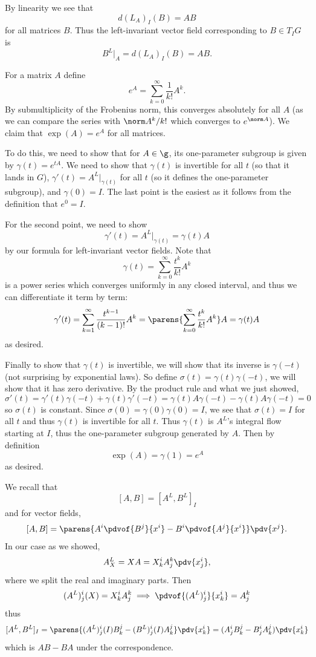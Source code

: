     By linearity we see that
    $$ d(L_A)_I(B) = AB $$
    for all matrices $B$.
    Thus the left-invariant vector field corresponding to $B\in T_IG$ is
    $$ B^L|_A = d(L_A)_I(B) = AB . $$

    \item For a matrix $A$ define
    $$ e^A = \sum_{k=0}^\infty \frac1{k!}A^k . $$
    By submultiplicity of the Frobenius norm, this converges absolutely for all $A$ (as we can compare the series with $\norm A^k/k!$ which converges
    to $e^{\norm A}$).
    We claim that $\exp(A)=e^A$ for all matrices.

    To do this, we need to show that for $A\in\g$, its one-parameter subgroup is given by $\gamma(t)=e^{tA}$.
    We need to show that $\gamma(t)$ is invertible for all $t$ (so that it lands in $G$), $\gamma'(t)=A^L|_{\gamma(t)}$ for all $t$ (so it defines
    the one-parameter subgroup), and $\gamma(0)=I$.
    The last point is the easiest as it follows from the definition that $e^0=I$.

    For the second point, we need to show
    $$ \gamma'(t) = A^L|_{\gamma(t)} = \gamma(t)A $$
    by our formula for left-invariant vector fields.
    Note that
    $$ \gamma(t) = \sum_{k=0}^\infty \frac{t^k}{k!}A^k $$
    is a power series which converges uniformly in any closed interval, and thus we can differentiate it term by term:
    $$ \gamma'(t) = \sum_{k=1}^\infty \frac{t^{k-1}}{(k-1)!}A^k = \parens{\sum_{k=0}^\infty\frac{t^k}{k!}A^k}A = \gamma(t)A $$
    as desired.

    Finally to show that $\gamma(t)$ is invertible, we will show that its inverse is $\gamma(-t)$ (not surprising by exponential laws).
    So define $\sigma(t)=\gamma(t)\gamma(-t)$, we will show that it has zero derivative.
    By the product rule and what we just showed,
    $$ \sigma'(t) = \gamma'(t)\gamma(-t) + \gamma(t)\gamma'(-t) = \gamma(t)A\gamma(-t) - \gamma(t)A\gamma(-t) = 0 $$
    so $\sigma(t)$ is constant.
    Since $\sigma(0)=\gamma(0)\gamma(0)=I$, we see that $\sigma(t)=I$ for all $t$ and thus $\gamma(t)$ is invertible for all $t$.
    Thus $\gamma(t)$ is $A^L$'s integral flow starting at $I$, thus the one-parameter subgroup generated by $A$.
    Then by definition
    $$ \exp(A) = \gamma(1) = e^A $$
    as desired.

    \item
    \benum
        \item We recall that
        $$ [A,B] = [A^L,B^L]_I $$
        and for vector fields,
        $$ [A,B] = \parens{A^i\pdvof{B^j}{x^i} - B^i\pdvof{A^j}{x^i}}\pdv{x^j} . $$
        In our case as we showed,
        $$ A^L_X = XA = X^i_kA^k_j \pdv{x^i_j}, $$
        where we split the real and imaginary parts.
        Then
        $$ (A^L)^i_j(X) = X^i_kA^k_j \implies \pdvof{(A^L)^i_j}{x^i_k} = A^k_j $$
        thus
        $$ [A^L,B^L]_I = \parens{(A^L)^i_j(I)B^j_k - (B^L)^i_j(I)A^j_k}\pdv{x^i_k} = (A^i_jB^j_k - B^i_jA^j_k)\pdv{x^i_k} $$
        which is $AB-BA$ under the correspondence.

